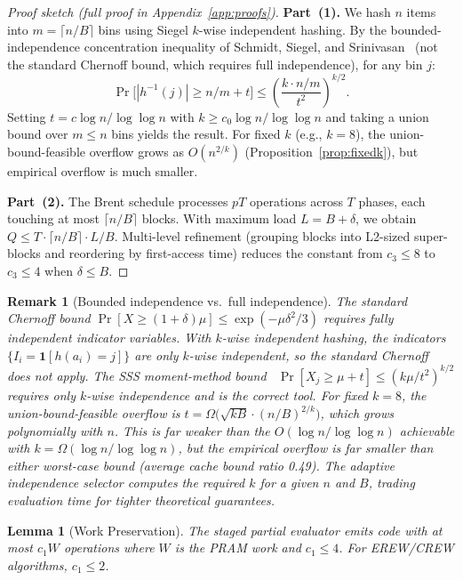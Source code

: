 \documentclass[11pt]{article}
\newtheorem{lemma}[theorem]{Lemma}
\newtheorem{remark}[theorem]{Remark}
\begin{document}
\begin{proof}[Proof sketch (full proof in Appendix~\ref{app:proofs})]
\textbf{Part~(1).}  We hash $n$ items into $m = \lceil n/B \rceil$ bins
using Siegel $k$-wise independent hashing.  By the
bounded-independence concentration inequality of Schmidt, Siegel, and
Srinivasan~\cite{schmidt1995chernoff} (not the standard Chernoff bound,
which requires full independence), for any bin $j$:
\[
  \Pr\bigl[|h^{-1}(j)| \ge n/m + t\bigr] \le \left(\frac{k \cdot n/m}{t^2}\right)^{k/2}.
\]
Setting $t = c \log n / \log\log n$ with
$k \ge c_0 \log n / \log\log n$ and taking a
union bound over $m \le n$ bins yields the result.
For fixed $k$ (e.g., $k = 8$), the union-bound-feasible overflow
grows as $O(n^{2/k})$ (Proposition~\ref{prop:fixedk}), but empirical
overflow is much smaller.

\textbf{Part~(2).}  The Brent schedule processes $pT$ operations across
$T$ phases, each touching at most $\lceil n/B \rceil$ blocks.  With
maximum load $L = B + \delta$, we obtain
$Q \le T \cdot \lceil n/B \rceil \cdot L/B$.  Multi-level refinement
(grouping blocks into L2-sized super-blocks and reordering by
first-access time) reduces the constant from $c_3 \le 8$ to
$c_3 \le 4$ when $\delta \le B$.
\end{proof}

\begin{remark}[Bounded independence vs.\ full independence]
\label{rem:bounded}
The standard Chernoff bound $\Pr[X \ge (1+\delta)\mu] \le \exp(-\mu\delta^2/3)$
requires fully independent indicator variables.  With $k$-wise independent
hashing, the indicators $\{I_i = \mathbf{1}[h(a_i) = j]\}$ are only
$k$-wise independent, so the standard Chernoff does \emph{not} apply.
The SSS moment-method bound~\cite{schmidt1995chernoff}
$\Pr[X_j \ge \mu + t] \le (k\mu/t^2)^{k/2}$
requires only $k$-wise independence and is the correct tool.
For fixed $k = 8$, the union-bound-feasible overflow is
$t = \Omega\bigl(\sqrt{kB} \cdot (n/B)^{2/k}\bigr)$, which grows
polynomially with $n$.  This is far weaker than the $O(\log n / \log\log n)$
achievable with $k = \Omega(\log n / \log\log n)$, but the empirical
overflow is far smaller than either worst-case bound (average cache bound
ratio 0.49).  The adaptive independence selector computes the required $k$
for a given $n$ and $B$, trading evaluation time for tighter theoretical
guarantees.
\end{remark}

\begin{lemma}[Work Preservation]
\label{lem:work}
The staged partial evaluator emits code with at most $c_1 W$ operations
where $W$ is the PRAM work and $c_1 \le 4$.  For EREW/CREW algorithms,
$c_1 \le 2$.
\end{lemma}
\end{document}
